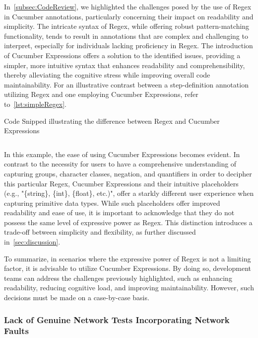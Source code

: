 In~\cref{subsec:CodeReview}, we highlighted the challenges posed by the use of \ac{Regex} in Cucumber annotations, particularly concerning their impact on readability and simplicity. The intricate syntax of \ac{Regex}, while offering robust pattern-matching functionality, tends to result in annotations that are complex and challenging to interpret, especially for individuals lacking proficiency in \ac{Regex}. The introduction of Cucumber Expressions offers a solution to the identified issues, providing a simpler, more intuitive syntax that enhances readability and comprehensibility, thereby alleviating the cognitive stress while improving overall code maintainability. For an illustrative contrast between a step-definition annotation utilizing \ac{Regex} and one employing Cucumber Expressions, refer to~\cref{lst:simpleRegex}.

\begin{listing}[!ht]
\caption{Code Snipped illustrating the difference between \ac{Regex} and Cucumber Expressions}
\label{lst:simpleRegex}
\inputminted{java}{files/code/simpleRegex.java}
\end{listing}

In this example, the ease of using Cucumber Expressions becomes evident. In contrast to the necessity for users to have a comprehensive understanding of capturing groups, character classes, negation, and quantifiers in order to decipher this particular \ac{Regex}, Cucumber Expressions and their intuitive placeholders (e.g., "\{string\}, \{int\}, \{float\}, etc.)", offer a starkly different user experience when capturing primitive data types. While such placeholders offer improved readability and ease of use, it is important to acknowledge that they do not possess the same level of expressive power as \ac{Regex}. This distinction introduces a trade-off between simplicity and flexibility, as further discussed in~\cref{sec:discussion}. 

To summarize, in scenarios where the expressive power of \ac{Regex} is not a limiting factor, it is advisable to utilize Cucumber Expressions. By doing so, development teams can address the challenges previously highlighted, such as enhancing readability, reducing cognitive load, and improving maintainability. However, such decisions must be made on a case-by-case basis.


\subsubsection{Lack of Genuine Network Tests Incorporating Network Faults}
\label{sub:lack-network-tests}

